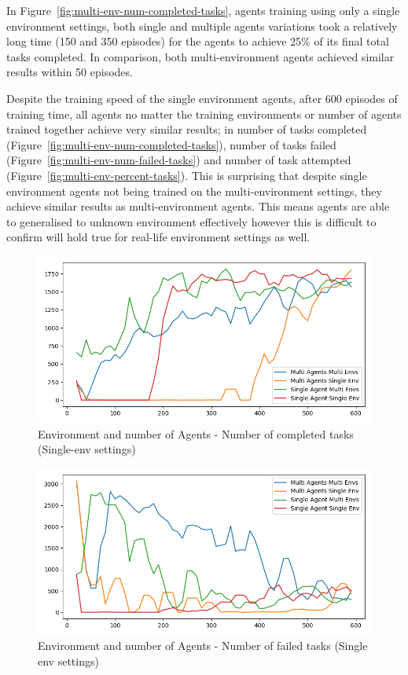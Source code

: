 In Figure~\ref{fig:multi-env-num-completed-tasks}, agents training using only a single environment settings, both
single and multiple agents variations took a relatively long time (150 and 350 episodes) for the agents to achieve 25\%
of its final total tasks completed. In comparison, both multi-environment agents achieved similar results within 50
episodes.

Despite the training speed of the single environment agents, after 600 episodes of training time, all agents no matter
the training environments or number of agents trained together achieve very similar results; in number of tasks
completed (Figure~\ref{fig:multi-env-num-completed-tasks}), number of tasks failed
(Figure~\ref{fig:multi-env-num-failed-tasks}) and number of task attempted (Figure~\ref{fig:multi-env-percent-tasks}).
This is surprising that despite single environment agents not being trained on the multi-environment settings, they
achieve similar results as multi-environment agents. This means agents are able to generalised to unknown environment
effectively however this is difficult to confirm will hold true for real-life environment settings as well.

\begin{figure}[H]
    \centering
    \includegraphics[width=\linewidth]{figures/5_evaluation_figs/env_agent_num_training_fig/single_env_num_completed_tasks.png}
    \caption{Environment and number of Agents - Number of completed tasks (Single-env settings)}
    \label{fig:single-env-num-completed-tasks}
\end{figure}

\begin{figure}[H]
    \centering
    \includegraphics[width=\linewidth]{figures/5_evaluation_figs/env_agent_num_training_fig/single_env_num_failed_tasks.png}
    \caption{Environment and number of Agents - Number of failed tasks (Single env settings)}
    \label{fig:single-env-num-failed-tasks}
\end{figure}

